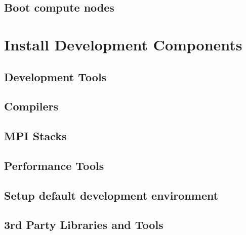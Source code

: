 \documentclass[letterpaper]{article}
\begin{document}
\subsection{Boot compute nodes} \label{sec:boot_computes}
 

\clearpage
\section{Install \OHPC{} Development Components}


\subsection{Development Tools} \label{sec:install_dev_tools}


\vspace*{-0.15cm}
\subsection{Compilers} \label{sec:install_compilers}


\subsection{MPI Stacks} \label{sec:mpi}


\subsection{Performance Tools} \label{sec:install_perf_tools}


\subsection{Setup default development environment}


\subsection{3rd Party Libraries and Tools} \label{sec:3rdparty}



\vspace*{0.1cm}

\vspace*{0.5cm}
\end{document}
